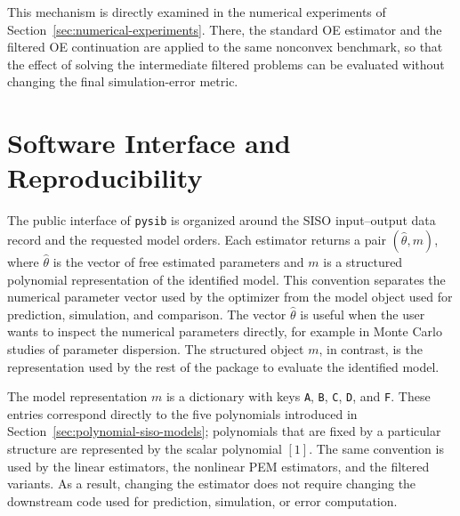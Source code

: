\documentclass{ifacconf}
\begin{document}
This mechanism is directly examined in the numerical experiments of
Section~\ref{sec:numerical-experiments}.  There, the standard OE estimator and
the filtered OE continuation are applied to the same nonconvex benchmark, so
that the effect of solving the intermediate filtered problems can be evaluated
without changing the final simulation-error metric.

\section{Software Interface and Reproducibility}
\label{sec:software-reproducibility}

The public interface of \texttt{pysib} is organized around the SISO
input--output data record and the requested model orders.  Each estimator returns
a pair \((\hat\theta,m)\), where \(\hat\theta\) is the vector of free estimated
parameters and \(m\) is a structured polynomial representation of the identified
model.  This convention separates the numerical parameter vector used by the
optimizer from the model object used for prediction, simulation, and comparison.
The vector \(\hat\theta\) is useful when the user wants to inspect the numerical
parameters directly, for example in Monte Carlo studies of parameter dispersion.
The structured object \(m\), in contrast, is the representation used by the rest
of the package to evaluate the identified model.

The model representation \(m\) is a dictionary with keys \texttt{A}, \texttt{B},
\texttt{C}, \texttt{D}, and \texttt{F}.  These entries correspond directly to
the five polynomials introduced in Section~\ref{sec:polynomial-siso-models};
polynomials that are fixed by a particular structure are represented by the
scalar polynomial \([1]\).  The same convention is used by the linear estimators,
the nonlinear PEM estimators, and the filtered variants.  As a result, changing
the estimator does not require changing the downstream code used for prediction,
simulation, or error computation.
\end{document}
